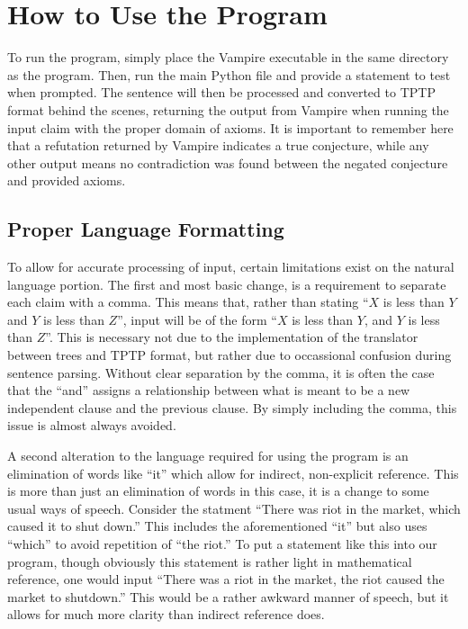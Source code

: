 \section{How to Use the Program}

To run the program, simply place the Vampire executable in the same directory as the program. Then, run the main Python file and provide a statement to test when prompted. The sentence will then be processed and converted to TPTP format behind the scenes, returning the output from Vampire when running the input claim with the proper domain of axioms. It is important to remember here that a refutation returned by Vampire indicates a true conjecture, while any other output means no contradiction was found between the negated conjecture and provided axioms.

\subsection{Proper Language Formatting}

To allow for accurate processing of input, certain limitations exist on the natural language portion. The first and most basic change, is a requirement to separate each claim with a comma. This means that, rather than stating ``$X$ is less than $Y$ and $Y$ is less than $Z$'', input will be of the form ``$X$ is less than $Y$, and $Y$ is less than $Z$''. This is necessary not due to the implementation of the translator between trees and TPTP format, but rather due to occassional confusion during sentence parsing. Without clear separation by the comma, it is often the case that the ``and'' assigns a relationship between what is meant to be a new independent clause and the previous clause. By simply including the comma, this issue is almost always avoided.

A second alteration to the language required for using the program is an elimination of words like ``it'' which allow for indirect, non-explicit reference. This is more than just an elimination of words in this case, it is a change to some usual ways of speech. Consider the statment ``There was riot in the market, which caused it to shut down.'' This includes the aforementioned ``it'' but also uses ``which'' to avoid repetition of ``the riot.'' To put a statement like this into our program, though obviously this statement is rather light in mathematical reference, one would input ``There was a riot in the market, the riot caused the market to shutdown.'' This would be a rather awkward manner of speech, but it allows for much more clarity than indirect reference does. 

